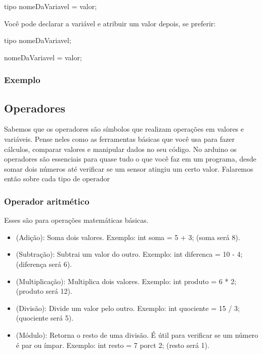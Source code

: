 \documentclass{report}
\begin{document}
	\begin{center}
		\begin{LARGE}
			tipo nomeDaVariavel = valor;
		\end{LARGE}
	\end{center}
	
	Você pode declarar a variável e atribuir um valor depois, se preferir:
	
		\begin{center}
		\begin{LARGE}
			tipo nomeDaVariavel;
			
			nomeDaVariavel = valor;
		\end{LARGE}
	\end{center}
	
	\subsubsection{Exemplo}
	
	\subsection{Operadores}
	Sabemos que os operadores são símbolos que realizam operações em valores e variáveis. Pense neles como as ferramentas básicas que você usa para fazer cálculos, comparar valores e manipular dados no seu código. No arduino os operadores são essenciais para quase tudo o que você faz em um programa, desde somar dois números até verificar se um sensor atingiu um certo valor. Falaremos então sobre cada tipo de operador
	\subsubsection{Operador aritmético}
	Esses são para operações matemáticas básicas.
	
	\begin{itemize}
		\item (Adição): Soma dois valores. Exemplo: int soma = 5 + 3; (soma será 8).
		\item (Subtração): Subtrai um valor do outro. Exemplo: int diferenca = 10 - 4; (diferença será 6).
		\item (Multiplicação): Multiplica dois valores. Exemplo: int produto = 6 * 2; (produto será 12).
		\item (Divisão): Divide um valor pelo outro. Exemplo: int quociente = 15 / 3; (quociente será 5).
		\item (Módulo): Retorna o resto de uma divisão. É útil para verificar se um número é par ou ímpar. Exemplo: int resto = 7 porct 2; (resto será 1).
		
	\end{itemize}
	
\end{document}
